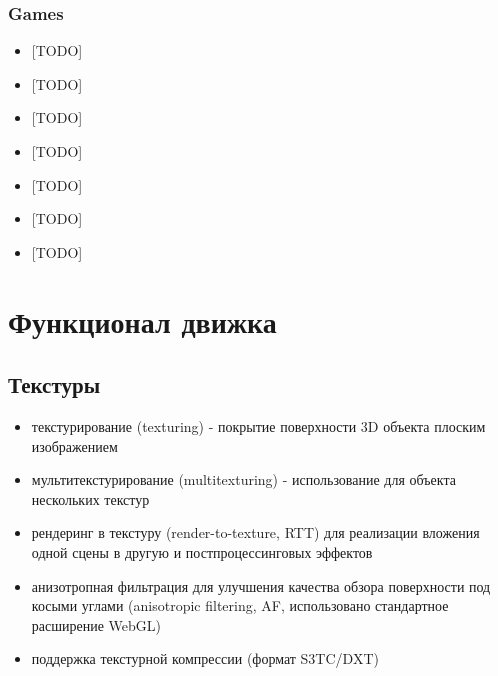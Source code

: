 \documentclass[a4paper,12pt,oneside]{sphinxmanual}
\begin{document}
\subsection{Games}
\label{about:id23}\begin{itemize}
\item {} 
{[}TODO{]}

\item {} 
{[}TODO{]}

\item {} 
{[}TODO{]}

\item {} 
{[}TODO{]}

\item {} 
{[}TODO{]}

\item {} 
{[}TODO{]}

\item {} 
{[}TODO{]}

\end{itemize}


\chapter{Функционал движка}
\label{features::doc}\label{features:features}\label{features:id1}

\section{Текстуры}
\label{features:id2}\begin{itemize}
\item {} 
текстурирование (texturing) - покрытие поверхности 3D объекта плоским изображением

\item {} 
мультитекстурирование (multitexturing) - использование для объекта нескольких текстур

\item {} 
рендеринг в текстуру (render-to-texture, RTT) для реализации вложения одной сцены в другую и постпроцессинговых эффектов

\item {} 
анизотропная фильтрация для улучшения качества обзора поверхности под косыми углами (anisotropic filtering, AF, использовано стандартное расширение WebGL)

\item {} 
поддержка текстурной компрессии (формат S3TC/DXT)

\end{itemize}
\end{document}
